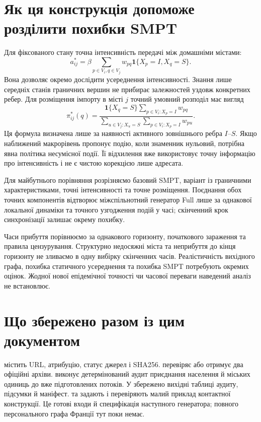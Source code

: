 \documentclass[11pt,a4paper]{article}
\begin{document}
\section{Як ця конструкція допоможе розділити похибки SMPT}
Для фіксованого стану точна інтенсивність передачі між домашніми містами:
\[
a^*_{ij}=\beta\sum_{p\in V_i,q\in V_j}
w_{pq}\mathbf1\{X_p=I,X_q=S\}.
\]
Вона дозволяє окремо дослідити усереднення інтенсивності. Знання лише середніх станів граничних вершин не прибирає залежностей уздовж конкретних ребер. Для розміщення імпорту в місті $j$ точний умовний розподіл має вигляд
\[
\pi^*_{ij}(q)=
\frac{\mathbf1\{X_q=S\}\sum_{p\in V_i:X_p=I}w_{pq}}
{\sum_{u\in V_j:X_u=S}\sum_{p\in V_i:X_p=I}w_{pu}}.
\]
Ця формула визначена лише за наявності активного зовнішнього ребра $I$--$S$. Якщо наближений макрорівень пропонує подію, коли знаменник нульовий, потрібна явна політика несумісної події. Її відхилення вже використовує точну інформацію про інтенсивність і не є чистою корекцією лише адресата.

Для майбутнього порівняння розрізняємо базовий SMPT, варіант із граничними характеристиками, точні інтенсивності та точне розміщення. Поєднання обох точних компонентів відтворює міжспільнотний генератор Full лише за однакової локальної динаміки та точного узгодження подій у часі; скінченний крок синхронізації залишає окрему похибку.

Часи прибуття порівнюємо за однакового горизонту, початкового зараження та правила цензурування. Структурно недосяжні міста та неприбуття до кінця горизонту не зливаємо в одну вибірку скінченних часів. Реалістичність вихідного графа, похибка статичного усереднення та похибка SMPT потребують окремих оцінок. Жодної нової епідемічної точності чи часової переваги наведений аналіз не встановлює.

\section{Що збережено разом із цим документом}
 містить URL, атрибуцію, статус джерел і SHA256.  перевіряє або отримує два офіційні архіви.  виконує детермінований аудит приєднання населення й міських одиниць до вже підготовлених потоків. У  збережено вихідні таблиці аудиту, підсумки й маніфест.  та  задають і перевіряють малий приклад контактної конструкції. Це готові входи й специфікація наступного генератора; повного персонального графа Франції тут поки немає.

\end{document}
